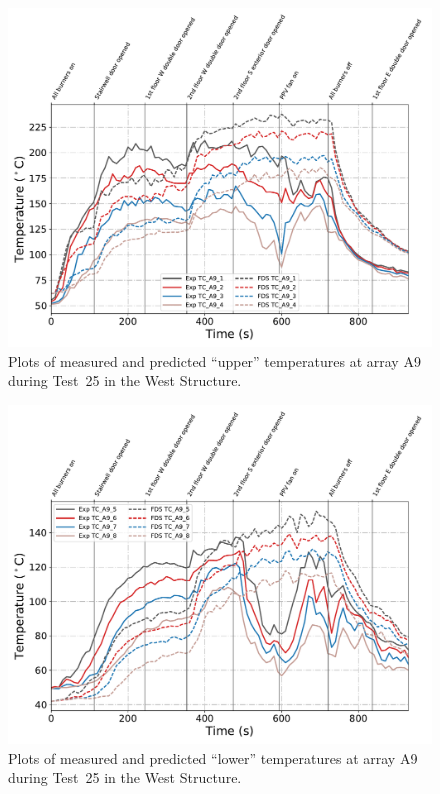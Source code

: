 \begin{figure}[!h]
	\centering
	\includegraphics[width=\columnwidth]{Figures/Plots/Validation/Temperature/Test_25_TC_A9_upper}
	\caption{Plots of measured and predicted ``upper'' temperatures at array A9 during Test~25 in the West Structure.}
	\label{fig:TCA9_upper_data_Test25}
\end{figure}

\begin{figure}[!h]
	\centering
	\includegraphics[width=\columnwidth]{Figures/Plots/Validation/Temperature/Test_25_TC_A9_lower}
	\caption{Plots of measured and predicted ``lower'' temperatures at array A9 during Test~25 in the West Structure.}
	\label{fig:TCA9_lower_data_Test25}
\end{figure}

